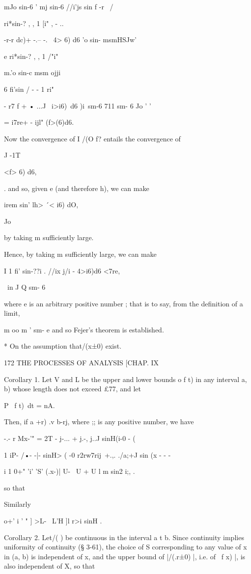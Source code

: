 mJo sin-6 ' mj sin-6 //i'js sin f -r \ /

ri*sin-? , , 1 [i" , - ..

-r-r dc)+ -.-- -. \ 4> 6) d6 'o sin- msmHSJw'

e ri*sin-? , , 1 /"i"

m.'o sin-c msm ojji

6 fi'sin / - - 1 ri"

 - r7 f + • ...J \ i>i6)\ d6 )i\ sm-6 711 sm- 6 Jo ' '

= i7re+ - ijl" (f>(6)d6.

Now the convergence of I /(O f? entails the convergence of

J -1T

<f> 6) d6,

. and so, given e (and therefore h), we can make

 irem sin' lh> \'\ < i6) dO,

Jo

by taking m sufficiently large.

Hence, by taking m sufficiently large, we can make

I 1 fi' sin-??i . //ix j/i - 4>i6)d6 <7re,

\ in J Q sm- 6

where e is an arbitrary positive number ; that is to say, from the
definition of a limit,

m oo m ' sm- e and so Fejer's theorem is established.

* On the assumption that/(x±0) exist.

172 THE PROCESSES OF ANALYSIS [CHAP. IX

Corollary 1. Let V and L be the upper and lower bounds o f t) in any
interval a, b) whose length does not exceed £77, and let

P \ f t)\ dt = nA.

Then, if a +r) .v b-rj, where ;; is any positive number, we have

 -.- r Mx-'" = 2T - j-... + j.-, j..J sinH(i-0 - (

  1 iP- /•- -|- sinH> ( -0 r2rw7rij\ +.,. ./a;+J sin (x - - -

i 1 0+" 'i' 'S' (.x-)| U- \ U + U l m sin2 i;, .

so that

Similarly

    o+' i ' " ] >L- \ L'H ]l r>i sinH .

Corollary 2. Let/( ) be continuous in the interval a t b. Since
continuity implies uniformity of continuity (§ 3-61), the choice of S
corresponding to any value of x in (a, b) is independent of x, and the
upper bound of |/(.r±0) |, i.e. of \ f x) |, is also independent of X,
so that

